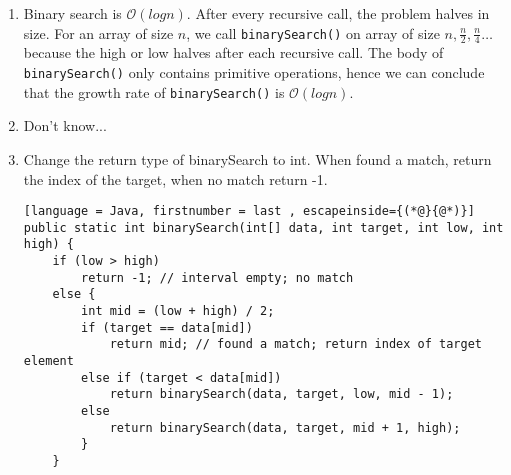 \begin{enumerate}
    \addtocounter{enumii}{1}
    \item
          Binary search is $\mathcal{O}(log{n})$. After every recursive call, the problem halves in size. For an array of size $n$, we call \lstinline{binarySearch()} on array of size $n, \frac{n}{2}, \frac{n}{4} \ldots$ because the high or low halves after each recursive call. The body of \lstinline{binarySearch()} only contains primitive operations, hence we can conclude that the growth rate of \lstinline{binarySearch()} is $\mathcal{O}(log{n})$.

    \item
          Don't know...

    \item Change the return type of binarySearch to int. When found a match, return the index of the target, when no match return -1.

          \begin{lstlisting}[language = Java, firstnumber = last , escapeinside={(*@}{@*)}]
public static int binarySearch(int[] data, int target, int low, int high) { 
    if (low > high)
        return -1; // interval empty; no match
    else {
        int mid = (low + high) / 2;
        if (target == data[mid])
            return mid; // found a match; return index of target element 
        else if (target < data[mid])
            return binarySearch(data, target, low, mid - 1);
        else
            return binarySearch(data, target, mid + 1, high);
        }
    }
\end{lstlisting}
\end{enumerate}
\clearpage